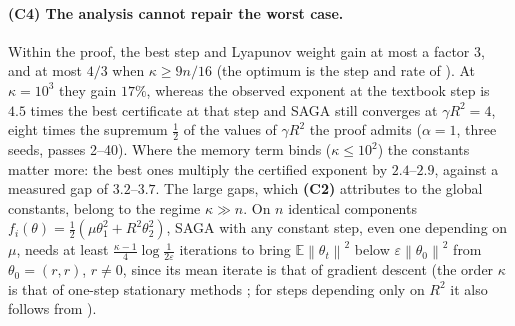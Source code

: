 \documentclass[10pt]{article}
\theoremstyle{remark}
\newcommand{\E}{\mathbb{E}}
\newcommand{\norm}[1]{\left\|#1\right\|}
\newcommand{\finding}[1]{\textbf{(#1)}}
\begin{document}
\paragraph{(C4) The analysis cannot repair the worst case.} Within the proof, the best step and Lyapunov weight gain at most
a factor $3$, and at most $4/3$ when $\kappa\ge9n/16$ (the optimum is the step and rate of \cite{hofmann2015variance}).
At $\kappa=10^3$ they gain $17\%$, whereas the observed exponent at the textbook step is $4.5$ times the best
certificate at that step and SAGA still converges at $\gamma R^2=4$, eight times the supremum $\frac12$ of the values of
$\gamma R^2$ the proof admits ($\alpha=1$, three seeds, passes 2--40). Where the memory term binds ($\kappa\le10^2$) the
constants matter more: the best ones multiply the certified exponent by $2.4$--$2.9$, against a measured gap of
$3.2$--$3.7$. The large gaps, which \finding{C2} attributes to the global constants, belong to the regime $\kappa\gg n$.
On $n$ identical components $f_i(\theta)=\frac12(\mu\theta_1^2+R^2\theta_2^2)$, SAGA with any constant step, even one depending on
$\mu$, needs at least $\frac{\kappa-1}4\log\frac1{2\varepsilon}$ iterations to bring $\E\norm{\theta_t}^2$ below $\varepsilon\norm{\theta_0}^2$ from
$\theta_0=(r,r)$, $r\ne0$, since its mean iterate is that of gradient
descent (the order $\kappa$ is that of one-step stationary methods \cite[Theorem~8]{arjevani2016lower}; for steps
depending only on $R^2$ it also follows from \cite{arjevani2016iteration}).
\end{document}
